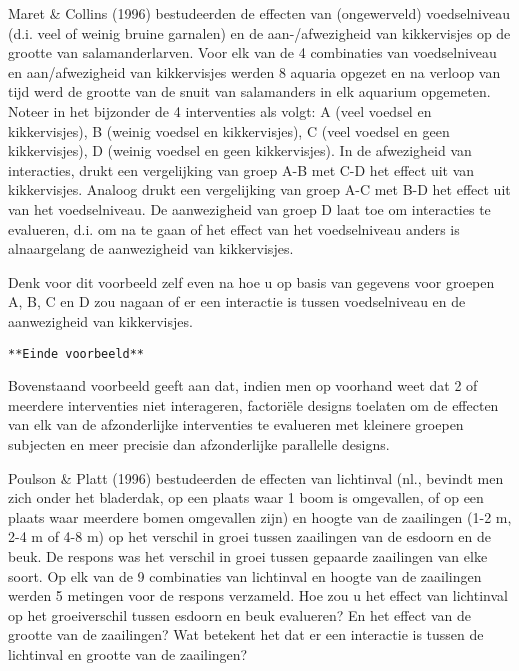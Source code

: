 \documentclass[12pt,dutch,coursenotes]{book}
\theoremstyle{definition}
\theoremstyle{definition}
\theoremstyle{definition}
\theoremstyle{remark}
\let\BeginKnitrBlock\begin \let\EndKnitrBlock\end
\begin{document}
Maret \& Collins (1996) bestudeerden de effecten van (ongewerveld)
voedselniveau (d.i. veel of weinig bruine garnalen) en de
aan-/afwezigheid van kikkervisjes op de grootte van salamanderlarven.
Voor elk van de 4 combinaties van voedselniveau en aan/afwezigheid van
kikkervisjes werden 8 aquaria opgezet en na verloop van tijd werd de
grootte van de snuit van salamanders in elk aquarium opgemeten. Noteer
in het bijzonder de 4 interventies als volgt: A (veel voedsel en
kikkervisjes), B (weinig voedsel en kikkervisjes), C (veel voedsel en
geen kikkervisjes), D (weinig voedsel en geen kikkervisjes). In de
afwezigheid van interacties, drukt een vergelijking van groep A-B met
C-D het effect uit van kikkervisjes. Analoog drukt een vergelijking van
groep A-C met B-D het effect uit van het voedselniveau. De aanwezigheid
van groep D laat toe om interacties te evalueren, d.i. om na te gaan of
het effect van het voedselniveau anders is alnaargelang de aanwezigheid
van kikkervisjes.

Denk voor dit voorbeeld zelf even na hoe u op basis van gegevens voor
groepen A, B, C en D zou nagaan of er een interactie is tussen
voedselniveau en de aanwezigheid van kikkervisjes.

\texttt{**Einde\ voorbeeld**}

Bovenstaand voorbeeld geeft aan dat, indien men op voorhand weet dat 2
of meerdere interventies niet interageren, factoriële designs toelaten
om de effecten van elk van de afzonderlijke interventies te evalueren
met kleinere groepen subjecten en meer precisie dan afzonderlijke
parallelle designs.

\BeginKnitrBlock{example}[Groei van esdoorn versus beuk]
\protect\hypertarget{exm:unnamed-chunk-26}{}{\label{exm:unnamed-chunk-26}
\iffalse (Groei van esdoorn versus beuk) \fi{} }
\EndKnitrBlock{example}

Poulson \& Platt (1996) bestudeerden de effecten van lichtinval (nl.,
bevindt men zich onder het bladerdak, op een plaats waar 1 boom is
omgevallen, of op een plaats waar meerdere bomen omgevallen zijn) en
hoogte van de zaailingen (1-2 m, 2-4 m of 4-8 m) op het verschil in
groei tussen zaailingen van de esdoorn en de beuk. De respons was het
verschil in groei tussen gepaarde zaailingen van elke soort. Op elk van
de 9 combinaties van lichtinval en hoogte van de zaailingen werden 5
metingen voor de respons verzameld. Hoe zou u het effect van lichtinval
op het groeiverschil tussen esdoorn en beuk evalueren? En het effect van
de grootte van de zaailingen? Wat betekent het dat er een interactie is
tussen de lichtinval en grootte van de zaailingen?
\end{document}
